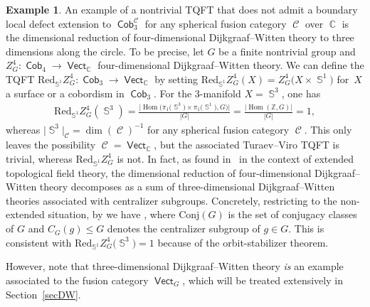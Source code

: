 \documentclass[pdftex]{sigma}
\DeclareMathOperator{\Hom}{Hom}
\DeclareMathOperator{\vect}{\mathsf{Vect}}
\DeclareMathOperator{\C}{\mathbb{C}}
\DeclareMathOperator{\Sp}{\mathbb{S}}
\DeclareMathOperator{\Cob}{\mathsf{Cob}}
\DeclareMathOperator{\calc}{\mathcal{C}}
\numberwithin{equation}{section}
\theoremstyle{definition}
\newtheorem{Example}[Example]{Example}
\begin{document}
\begin{Example}An example of a nontrivial TQFT that does not admit a boundary local defect extension to $\Cob_3^{\calc}$ for any spherical fusion category $\calc$ over $\C$ is the dimensional reduction of four-dimensional Dijkgraaf--Witten theory to three dimensions along the circle. To be precise, let $G$ be a finite nontrivial group and $Z_G^4\colon \Cob_4 \rightarrow \vect_{\C}$ four-dimensional Dijkgraaf--Witten theory. We can define the TQFT $\mathrm{Red}_{\Sp^1}Z_G^4\colon \Cob_3 \rightarrow \vect_{\C}$ by setting $\mathrm{Red}_{\Sp^1}Z_G^4(X) = Z_G^4\bigl(X \times \Sp^1\bigr)$ for~$X$ a surface or a cobordism in $\Cob_3$. For the 3-manifold $X = \Sp^3$, one has
 \begin{align*}
 \mathrm{Red}_{\Sp^1}Z_G^4(\Sp^3) = \frac{\bigl|{\Hom\bigl(\pi_1\bigl(\Sp^3\bigr) \times \pi_1\bigl(\Sp^1\bigr), G\bigr)}\bigr|}{|G|} = \frac{|{\Hom(\mathbb{Z}, G)}|}{|G|} = 1,
 \end{align*}
 whereas $\bigl| {\Sp^3}\bigr|_{\calc} = \dim(\calc)^{-1}$ for any spherical fusion category $\calc$. This only leaves the possibility $\calc = \vect_{\C}$, but the associated Turaev--Viro TQFT is trivial, whereas $\mathrm{Red}_{\Sp^1}Z_G^4$ is not. In fact, as found in~\cite{MW} in the context of extended topological field theory, the dimensional reduction of four-dimensional Dijkgraaf--Witten theory decomposes as a sum of three-dimensional Dijkgraaf--Witten theories associated with centralizer subgroups. Concretely, restricting to the non-extended situation, by \cite[Corollary~4.3]{MW} we have
 \smash{$ \mathrm{Red}_{\Sp^1}Z_G^4 \cong \bigoplus_{[g] \in \mathrm{Conj}(G)} Z_{C_G(g)}^3$},
 where $\mathrm{Conj}(G)$ is the set of conjugacy classes of $G$ and $C_G(g) \leq G$ denotes the centralizer subgroup of $g \in G$. This is consistent with $\mathrm{Red}_{\Sp^1}Z_G^4\bigl(\Sp^3\bigr) = 1$ because of the orbit-stabilizer theorem.

 However, note that three-dimensional Dijkgraaf--Witten theory \textit{is} an example associated to the fusion category $\vect_G$, which will be treated extensively in Section~\ref{secDW}.
\end{Example}
\end{document}
